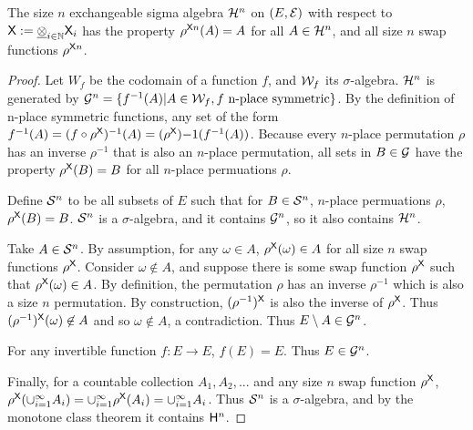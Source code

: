 \begin{lemma}
The size $n$ exchangeable sigma algebra $\mathcal{H}^n$ on $(E,\mathcal{E})$ with respect to $\mathsf{X}:=\underline{\otimes}_{i\in\mathbb{N}}\mathsf{X}_i$ has the property $\rho^{\mathsf{X}n}(A)=A$ for all $A\in \mathcal{H}^n$, and all size $n$ swap functions $\rho^{\mathsf{X}n}$.
\end{lemma}

\begin{proof}
Let $W_f$ be the codomain of a function $f$, and $\mathcal{W}_f$ its $\sigma$-algebra. $\mathcal{H}^n$ is generated by $\mathcal{G}^n=\{f^{-1}(A)|A\in \mathcal{W}_f,f\text{ n-place symmetric}\}$. By the definition of n-place symmetric functions, any set of the form $f^{-1}(A)=(f\circ\rho^{\mathsf{X}})^{-1}(A) = (\rho^{\mathsf{X}}){-1}(f^{-1}(A))$. Because every $n$-place permutation $\rho$ has an inverse $\rho^{-1}$ that is also an $n$-place permutation, all sets in $B\in\mathcal{G}$ have the property $\rho^{\mathsf{X}}(B)=B$ for all $n$-place permuations $\rho$.

Define $\mathcal{S}^n$ to be all subsets of $E$ such that for $B\in \mathcal{S}^n$, $n$-place permuations $\rho$, $\rho^{\mathsf{X}}(B)=B$. $\mathcal{S}^n$ is a $\sigma$-algebra, and it contains $\mathcal{G}^n$, so it also contains $\mathcal{H}^n$.

Take $A\in\mathcal{S}^n$. By assumption, for any $\omega\in A$, $\rho^{\mathsf{X}}(\omega)\in A$ for all size $n$ swap functions $\rho^{\mathsf{X}}$. Consider $\omega\not\in A$, and suppose there is some swap function $\rho^{\mathsf{X}}$ such that $\rho^{\mathsf{X}}(\omega)\in A$. By definition, the permutation $\rho$ has an inverse $\rho^{-1}$ which is also a size $n$ permutation. By construction, $(\rho^{-1})^{\mathsf{X}}$ is also the inverse of $\rho^{\mathsf{X}}$. Thus $(\rho^{-1})^{\mathsf{X}}(\omega)\not\in A$ and so $\omega\not\in A$, a contradiction. Thus $E\setminus A\in \mathcal{G}^n$.

For any invertible function $f:E\to E$, $f(E)=E$. Thus $E\in \mathcal{G}^n$.

Finally, for a countable collection $A_1,A_2,...$ and any size $n$ swap function $\rho^{\mathsf{X}}$, $\rho^{\mathsf{X}}(\cup_{i=1}^{\infty} A_i) = \cup_{i=1}^\infty \rho^{\mathsf{X}}(A_i) = \cup_{i=1}^\infty A_i$. Thus $\mathcal{S}^n$ is a $\sigma$-algebra, and by the monotone class theorem it contains $\mathsf{H}^n$.
\end{proof}

